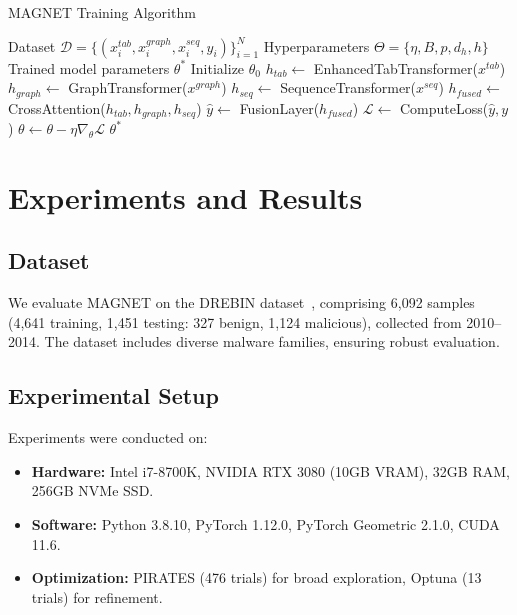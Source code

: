 \documentclass[10pt,conference]{IEEEtran}
\begin{document}
\begin{algorithm}
\caption{MAGNET Training Algorithm}
\begin{algorithmic}[1]
\REQUIRE Dataset $\mathcal{D} = \{(x_i^{tab}, x_i^{graph}, x_i^{seq}, y_i)\}_{i=1}^N$
\REQUIRE Hyperparameters $\Theta = \{\eta, B, p, d_h, h\}$
\ENSURE Trained model parameters $\theta^*$
\STATE Initialize $\theta_0$
        \STATE $h_{tab} \leftarrow$ EnhancedTabTransformer($x^{tab}$)
        \STATE $h_{graph} \leftarrow$ GraphTransformer($x^{graph}$)
        \STATE $h_{seq} \leftarrow$ SequenceTransformer($x^{seq}$)
        \STATE $h_{fused} \leftarrow$ CrossAttention($h_{tab}, h_{graph}, h_{seq}$)
        \STATE $\hat{y} \leftarrow$ FusionLayer($h_{fused}$)
        \STATE $\mathcal{L} \leftarrow$ ComputeLoss($\hat{y}, y$)
        \STATE $\theta \leftarrow \theta - \eta \nabla_\theta \mathcal{L}$
    \ENDFOR
\ENDFOR
\RETURN $\theta^*$
\end{algorithmic}
\end{algorithm}

\section{Experiments and Results}\label{sec:experiments}
\subsection{Dataset}
We evaluate MAGNET on the DREBIN dataset~\cite{Drebin}, comprising 6,092 samples (4,641 training, 1,451 testing: 327 benign, 1,124 malicious), collected from 2010–2014. The dataset includes diverse malware families, ensuring robust evaluation.

\subsection{Experimental Setup}
Experiments were conducted on:
\begin{itemize}
    \item \textbf{Hardware:} Intel i7-8700K, NVIDIA RTX 3080 (10GB VRAM), 32GB RAM, 256GB NVMe SSD.
    \item \textbf{Software:} Python 3.8.10, PyTorch 1.12.0, PyTorch Geometric 2.1.0, CUDA 11.6.
    \item \textbf{Optimization:} PIRATES (476 trials) for broad exploration, Optuna (13 trials) for refinement.
\end{itemize}
\end{document}
